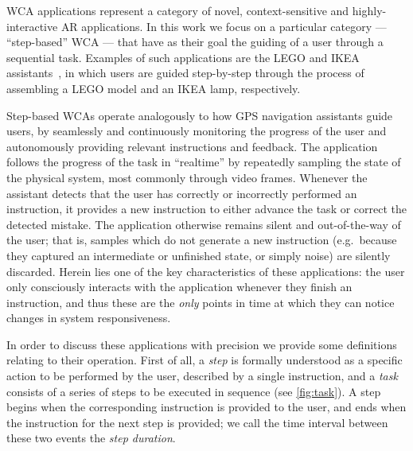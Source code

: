 \acf{WCA} applications represent a category of novel, context-sensitive and highly-interactive \ac{AR} applications.
In this work we focus on a particular category --- ``step-based'' \ac{WCA} --- that have as their goal the guiding of a user through a sequential task.
Examples of such applications are the LEGO and IKEA assistants~\cite{Chen2015LEGO,Chen2018application}, in which users are guided step-by-step through the process of assembling a LEGO model and an IKEA lamp, respectively.

Step-based \acp{WCA} operate analogously to how \ac{GPS} navigation assistants guide users, by seamlessly and continuously monitoring the progress of the user and autonomously providing relevant instructions and feedback.
The application follows the progress of the task in ``realtime'' by repeatedly sampling the state of the physical system, most commonly through video frames.
Whenever the assistant detects that the user has correctly or incorrectly performed an instruction, it provides a new instruction to either advance the task or correct the detected mistake.
The application otherwise remains silent and out-of-the-way of the user; that is, samples which do not generate a new instruction (e.g.~because they captured an intermediate or unfinished state, or simply noise) are silently discarded.
Herein lies one of the key characteristics of these applications: the user only consciously interacts with the application whenever they finish an instruction, and thus these are the \emph{only} points in time at which they can notice changes in system responsiveness.

In order to discuss these applications with precision we provide some definitions relating to their operation.
First of all, a \emph{step} is formally understood as a specific action to be performed by the user, described by a single instruction, and a \emph{task} consists of a series of steps to be executed in sequence (see \cref{fig:task}).
A step begins when the corresponding instruction is provided to the user, and ends when the instruction for the next step is provided; we call the time interval between these two events the \emph{step duration}.

